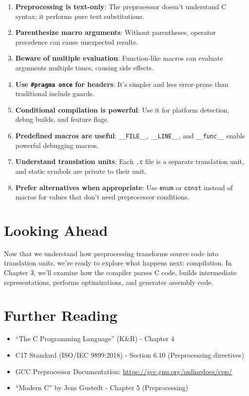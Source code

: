\begin{enumerate}
    \item \textbf{Preprocessing is text-only}: The preprocessor doesn't understand C syntax; it performs pure text substitutions.
    \item \textbf{Parenthesize macro arguments}: Without parentheses, operator precedence can cause unexpected results.
    \item \textbf{Beware of multiple evaluation}: Function-like macros can evaluate arguments multiple times, causing side effects.
    \item \textbf{Use \texttt{\#pragma once} for headers}: It's simpler and less error-prone than traditional include guards.
    \item \textbf{Conditional compilation is powerful}: Use it for platform detection, debug builds, and feature flags.
    \item \textbf{Predefined macros are useful}: \texttt{\_\_FILE\_\_}, \texttt{\_\_LINE\_\_}, and \texttt{\_\_func\_\_} enable powerful debugging macros.
    \item \textbf{Understand translation units}: Each \texttt{.c} file is a separate translation unit, and static symbols are private to their unit.
    \item \textbf{Prefer alternatives when appropriate}: Use \texttt{enum} or \texttt{const} instead of macros for values that don't need preprocessor conditions.
\end{enumerate}

\section{Looking Ahead}

Now that we understand how preprocessing transforms source code into translation units, we're ready to explore what happens next: compilation. In Chapter 3, we'll examine how the compiler parses C code, builds intermediate representations, performs optimizations, and generates assembly code.

\section{Further Reading}

\begin{itemize}
    \item ``The C Programming Language'' (K\&R) - Chapter 4
    \item C17 Standard (ISO/IEC 9899:2018) - Section 6.10 (Preprocessing directives)
    \item GCC Preprocessor Documentation: \url{https://gcc.gnu.org/onlinedocs/cpp/}
    \item ``Modern C'' by Jens Gustedt - Chapter 5 (Preprocessing)
\end{itemize}
